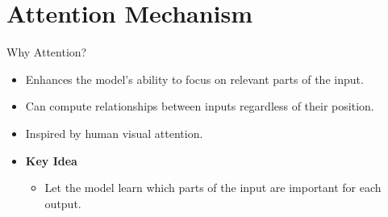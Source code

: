 \documentclass[serif, aspectratio=169]{beamer}
\begin{document}
\section{Attention Mechanism}

\begin{frame}{Why Attention?}
	\begin{itemize}
		\item Enhances the model's ability to focus on relevant parts of the input.
		\item Can compute relationships between inputs regardless of their position.
		\item Inspired by human visual attention.
		\item \textbf{Key Idea}
		\begin{itemize}
			\item Let the model learn which parts of the input are important for each output.
		\end{itemize}
	\end{itemize}
\end{frame}

%	
\end{document}
